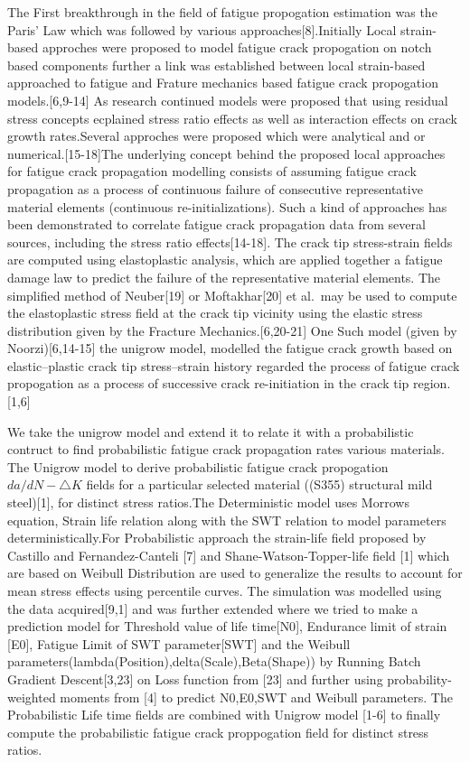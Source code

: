 \documentclass[11pt]{article}
\begin{document}
The First breakthrough in the field of fatigue propogation estimation
was the Paris' Law which was followed by various
approaches{[}8{]}.Initially Local strain-based approches were proposed
to model fatigue crack propogation on notch based components further a
link was established between local strain-based approached to fatigue
and Frature mechanics based fatigue crack propogation
models.{[}6,9-14{]} As research continued models were proposed that
using residual stress concepts ecplained stress ratio effects as well as
interaction effects on crack growth rates.Several approches were
proposed which were analytical and or numerical.{[}15-18{]}The
underlying concept behind the proposed local approaches for fatigue
crack propagation modelling consists of assuming fatigue crack
propagation as a process of continuous failure of consecutive
representative material elements (continuous re-initializations). Such a
kind of approaches has been demonstrated to correlate fatigue crack
propagation data from several sources, including the stress ratio
effects{[}14-18{]}. The crack tip stress-strain fields are computed
using elastoplastic analysis, which are applied together a fatigue
damage law to predict the failure of the representative material
elements. The simplified method of Neuber{[}19{]} or Moftakhar{[}20{]}
et al.~may be used to compute the elastoplastic stress field at the
crack tip vicinity using the elastic stress distribution given by the
Fracture Mechanics.{[}6,20-21{]} One Such model (given by
Noorzi){[}6,14-15{]} the unigrow model, modelled the fatigue crack
growth based on elastic--plastic crack tip stress--strain history
regarded the process of fatigue crack propogation as a process of
successive crack re-initiation in the crack tip region. {[}1,6{]}

We take the unigrow model and extend it to relate it with a
probabilistic contruct to find probabilistic fatigue crack propagation
rates various materials. The Unigrow model to derive probabilistic
fatigue crack propogation \(da/dN-\bigtriangleup K\) fields for a
particular selected material ((S355) structural mild steel){[}1{]}, for
distinct stress ratios.The Deterministic model uses Morrows equation,
Strain life relation along with the SWT relation to model parameters
deterministically.For Probabilistic approach the strain-life field
proposed by Castillo and Fernandez-Canteli {[}7{]} and
Shane-Watson-Topper-life field {[}1{]} which are based on Weibull
Distribution are used to generalize the results to account for mean
stress effects using percentile curves. The simulation was modelled
using the data acquired{[}9,1{]} and was further extended where we tried
to make a prediction model for Threshold value of life time{[}N0{]},
Endurance limit of strain {[}E0{]}, Fatigue Limit of SWT
parameter{[}SWT{]} and the Weibull
parameters(lambda(Position),delta(Scale),Beta(Shape)) by Running Batch
Gradient Descent{[}3,23{]} on Loss function from {[}23{]} and further
using probability-weighted moments from {[}4{]} to predict N0,E0,SWT and
Weibull parameters. The Probabilistic Life time fields are combined with
Unigrow model {[}1-6{]} to finally compute the probabilistic fatigue
crack proppogation field for distinct stress ratios.
\end{document}
